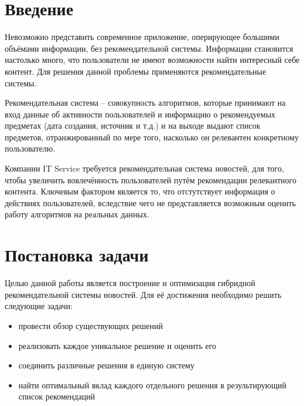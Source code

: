 \documentclass[14pt]{matmex-diploma-custom}
\begin{document}

\maketitle

\tableofcontents


\section*{Введение}

Невозможно представить современное приложение, оперирующее большими объёмами информации, без рекомендательной системы. Информации становится настолько много, что пользователи не имеют возможности найти интересный себе контент. Для решения данной проблемы применяются рекомендательные системы.

Рекомендательная система -- совокупность алгоритмов, которые принимают на вход данные об активности пользователей и информацию о рекомендуемых предметах (дата создания, источник и т.д.) и на выходе выдают список предметов, отранжированный по мере того, насколько он релевантен конкретному пользователю.

Компании IT Service требуется рекомендательная система новостей, для того, чтобы увеличить вовлечённость пользователей путём рекомендации релевантного контента.
Ключевым фактором является то, что отстутствует информация о действиях пользователей, вследствие чего не представляется возможным оценить работу алгоритмов на реальных данных.

\section{Постановка задачи}

Целью данной работы является построение и оптимизация гибридной рекомендательной системы новостей. Для её достижения необходимо решить следующие задачи:

\begin{itemize}
	\item провести обзор существующих решений
	\item реализовать каждое уникальное решение и оценить его
	\item соединить различные решения в единую систему
	\item найти оптимальный вклад каждого отдельного решения в результирующий список рекомендаций
\end{itemize}
\end{document}
